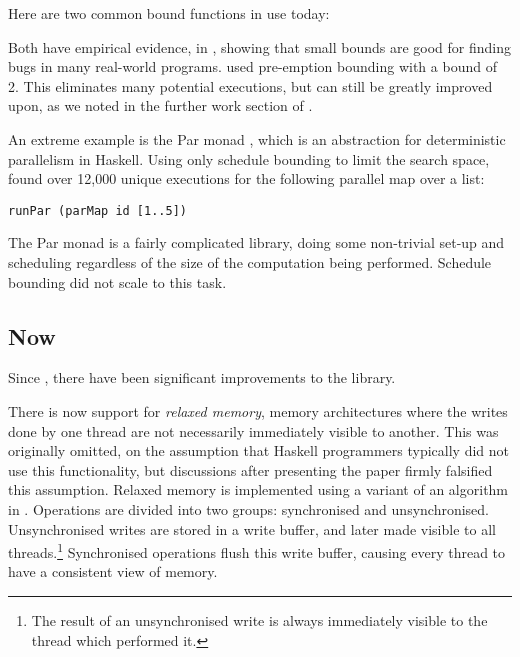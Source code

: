 Here are two common bound functions in use today:



Both have empirical evidence, in \citep{empirical}, showing that small
bounds are good for finding bugs in many real-world
programs. \dejafu{} used pre-emption bounding with a bound of 2. This
eliminates many potential executions, but can still be greatly
improved upon, as we noted in the further work section of
\citep{dejafu}.

An extreme example is the Par monad \citep{parmonad}, which is an
abstraction for deterministic parallelism in Haskell. Using only
schedule bounding to limit the search space, \dejafu{} found over
12,000 unique executions for the following parallel map over a list:

\begin{verbatim}
runPar (parMap id [1..5])
\end{verbatim}

The Par monad is a fairly complicated library, doing some non-trivial
set-up and scheduling regardless of the size of the computation being
performed. Schedule bounding did not scale to this task.

\subsection{\dejafu{} Now}
\label{sec:progress-dejafu-now}

Since \citep{dejafu}, there have been significant improvements to the
library.

There is now support for \emph{relaxed memory}, memory architectures
where the writes done by one thread are not necessarily immediately
visible to another. This was originally omitted, on the assumption
that Haskell programmers typically did not use this functionality, but
discussions after presenting the paper firmly falsified this
assumption. Relaxed memory is implemented using a variant of an
algorithm in \citep{rdpor}. Operations are divided into two groups:
synchronised and unsynchronised. Unsynchronised writes are stored in a
write buffer, and later made visible to all threads.\footnote{The
  result of an unsynchronised write is always immediately visible to
  the thread which performed it.} Synchronised operations flush this
write buffer, causing every thread to have a consistent view of
memory.


